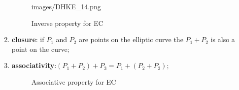 \begin{enumerate}[1.]
\begin{figure}[H]
{	         {images/DHKE_14.png}}
	  \caption{\label{fig:DH:DHKE_14} Inverse property for EC }
\end{figure}
\item \textbf{closure}: if $P_1$ and $P_2$ are points on the elliptic curve the $P_1 + P_2$ is also a point on the curve;
\item \textbf{associativity}:$(P_1 + P_2) + P_3 = P_1 + (P_2 + P_3)$;
\begin{figure}[H]
	  \caption{\label{fig:DH:DHKE_12} Associative property for EC}
\end{figure}
\end{enumerate}

